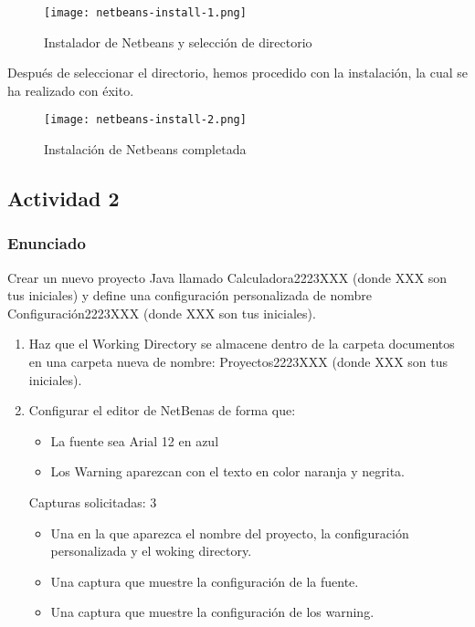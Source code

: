 \begin{enumerate}[label=(\alph*)]
    \begin{figure}[ht]
        \centering
        \texttt{[image: netbeans-install-1.png]}
        \caption{Instalador de Netbeans y selección de directorio}
    \end{figure}

    Después de seleccionar el directorio, hemos procedido con la instalación, la cual se ha realizado con éxito.

    \begin{figure}[ht]
        \centering
        \texttt{[image: netbeans-install-2.png]}
        \caption{Instalación de Netbeans completada}
    \end{figure}
\end{enumerate}

\subsection{Actividad 2}
\subsubsection{Enunciado}
Crear un nuevo proyecto Java llamado Calculadora2223XXX (donde XXX son tus iniciales) y define una configuración personalizada de nombre Configuración2223XXX (donde XXX son tus iniciales).

\begin{enumerate}[label=(\alph*)]
    \item Haz que el Working Directory se almacene dentro de la carpeta documentos en una carpeta nueva de nombre: Proyectos2223XXX (donde XXX son tus iniciales).

    \item Configurar el editor de NetBenas de forma que:
    \begin{itemize}
        \item La fuente sea Arial 12 en azul
        \item Los Warning aparezcan con el texto en color naranja y negrita.
    \end{itemize}

    Capturas solicitadas: 3
    \begin{itemize}
        \item Una en la que aparezca el nombre del proyecto, la configuración personalizada y el woking directory.
        \item Una captura que muestre la configuración de la fuente.
        \item Una captura que muestre la configuración de los warning.
    \end{itemize}
\end{enumerate}

